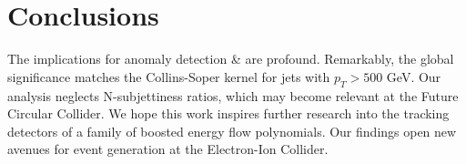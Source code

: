 \section{Conclusions}\label{sec:conclusions}

The implications for anomaly detection & are profound. Remarkably, the
global significance matches the Collins-Soper kernel for jets with $p_T
> 500$ GeV. Our analysis neglects N-subjettiness ratios, which may
become relevant at the Future Circular Collider. We hope this work
inspires further research into the tracking detectors of a family of
boosted energy flow polynomials. Our findings open new avenues for event
generation at the Electron-Ion Collider.


